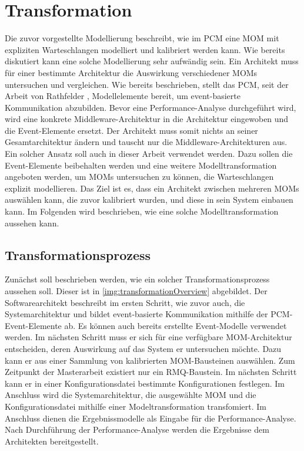 
\chapter{Transformation}
\label{ch:transformation}
Die zuvor vorgestellte Modellierung beschreibt, wie im PCM eine MOM mit expliziten Warteschlangen modelliert und kalibriert werden kann. Wie bereits diskutiert kann eine solche Modellierung sehr aufwändig sein. Ein Architekt muss für einer bestimmte Architektur die Auswirkung verschiedener MOMs untersuchen und vergleichen. Wie bereits beschrieben, stellt das PCM, seit der Arbeit von Rathfelder \cite{Rathfelder2013}, Modellelemente bereit, um event-basierte Kommunikation abzubilden. Bevor eine Performance-Analyse durchgeführt wird, wird eine konkrete Middleware-Architektur in die Architektur eingewoben und die Event-Elemente ersetzt. Der Architekt muss somit nichts an seiner Gesamtarchitektur ändern und tauscht nur die Middleware-Architekturen aus. Ein solcher Ansatz soll auch in dieser Arbeit verwendet werden. Dazu sollen die Event-Elemente beibehalten werden und eine weitere Modelltransformation angeboten werden, um MOMs untersuchen zu können, die Warteschlangen explizit modellieren. Das Ziel ist es, dass ein Architekt zwischen mehreren MOMs auswählen kann, die zuvor kalibriert wurden, und diese in sein System einbauen kann. Im Folgenden wird beschrieben, wie eine solche Modelltransformation aussehen kann.

\section{Transformationsprozess}
Zunächst soll beschrieben werden, wie ein solcher Transformationsprozess aussehen soll. Dieser ist in \autoref{img:transformationOverview} abgebildet. Der Softwarearchitekt beschreibt im ersten Schritt, wie zuvor auch, die Systemarchitektur und bildet event-basierte Kommunikation mithilfe der PCM-Event-Elemente ab. Es können auch bereits erstellte Event-Modelle verwendet werden. Im nächsten Schritt muss er sich für eine verfügbare MOM-Architektur entscheiden, deren Auswirkung auf das System er untersuchen möchte. Dazu kann er aus einer Sammlung von kalibrierten MOM-Bausteinen auswählen. Zum Zeitpunkt der Masterarbeit existiert nur ein RMQ-Baustein. Im nächsten Schritt kann er in einer Konfigurationsdatei bestimmte Konfigurationen festlegen. Im Anschluss wird die Systemarchitektur, die ausgewählte MOM und die Konfigurationsdatei mithilfe einer Modeltransformation transfomiert. Im Anschluss dienen die Ergebnissmodelle als Eingabe für die Performance-Analyse. Nach Durchführung der Performance-Analyse werden die Ergebnisse dem Architekten bereitgestellt.

